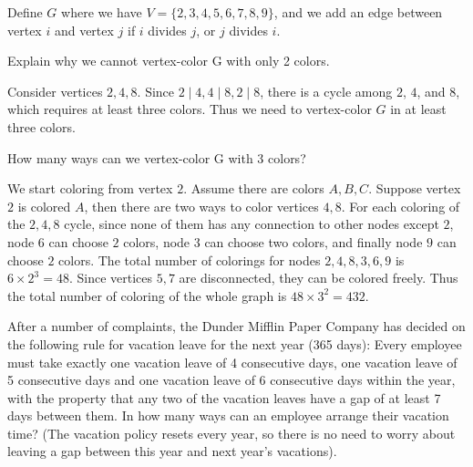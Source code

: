 \documentclass[11pt]{article}
\begin{document}
\newpage
{}

Define $G$ where we have $V=\{2, 3, 4, 5, 6, 7, 8, 9\}$, and we add an 
edge between vertex $i$ and vertex $j$ if $i$ divides $j$, or $j$ divides $i$.

\begin{Parts}
    
    \Part Explain why we cannot vertex-color G with only 2 colors.

    \begin{Answer}
        Consider vertices $2,4,8$. Since $2 \mid 4, 4 \mid 8, 2 \mid 8$, there 
        is a cycle among $2$, $4$, and $8$, which requires at least three colors. 
        Thus we need to vertex-color $G$ in at least three colors. 
    \end{Answer}

    \Part How many ways can we vertex-color G with 3 colors?

    \begin{Answer}
        We start coloring from vertex $2$. Assume there are colors $A,B,C$. 
        Suppose vertex $2$ is colored $A$, then there are two ways to color vertices
        $4,8$. For each coloring of the $2,4,8$ cycle, since none of them has any 
        connection to other nodes except $2$, node $6$ can choose $2$ colors, 
        node $3$ can choose two colors, and finally node $9$ can choose $2$ colors. 
        The total number of colorings for nodes $2,4,8,3,6,9$ is $6 \times 2^3 = 48$. 
        Since vertices $5,7$ are disconnected, they can be colored freely. Thus 
        the total number of coloring of the whole graph is $48 \times 3^2 = 432$. 
    \end{Answer}

\end{Parts}

\newpage
{}
After a number of complaints, the Dunder Mifflin Paper Company has decided on the following rule for vacation leave for the next year (365 days): Every employee must take exactly one vacation leave of 4 consecutive days, one vacation leave of 5 consecutive days and one vacation leave of 6 consecutive days within the year, with the property that any two of the vacation leaves have a gap of at least 7 days between them. In how many ways can an employee arrange their vacation time? (The vacation policy resets every year, 
so there is no need to worry about leaving a gap between this year and next year's vacations).
\end{document}
